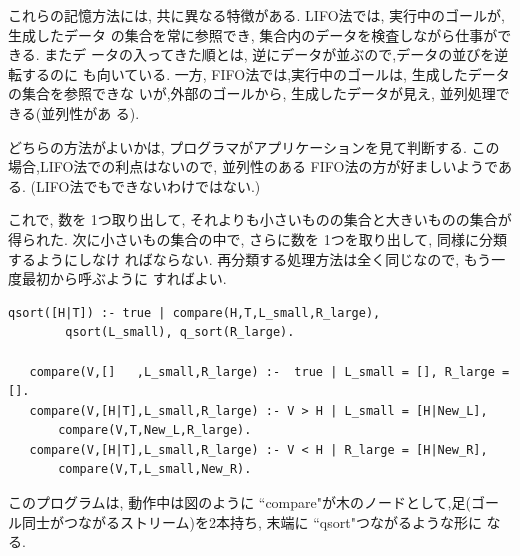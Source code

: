 \documentclass[a4,titlepage]{jsreport}
\def\_{\leavevmode \kern.06em \vbox{\hrule width.3em}\penalty\exhyphenpenalty}
\begin{document}
  これらの記憶方法には,  共に異なる特徴がある. 
LIFO法では,  実行中のゴールが,  生成したデータ
の集合を常に参照でき,  集合内のデータを検査しながら仕事ができる.  またデ
ータの入ってきた順とは,  逆にデータが並ぶので,データの並びを逆転するのに
も向いている. 
  一方,  FIFO法では,実行中のゴールは,  生成したデータの集合を参照できな
いが,外部のゴールから,  生成したデータが見え,  並列処理できる(並列性があ
る).  \par
  どちらの方法がよいかは,  プログラマがアプリケーションを見て判断する.  
  この場合,LIFO法での利点はないので,  並列性のある
  FIFO法の方が好ましいようである. (LIFO法でもできないわけではない.)

  これで, 数を 1つ取り出して,  それよりも小さいものの集合と大きいものの集合が
得られた.
次に小さいもの集合の中で,  さらに数を 1つを取り出して,  同様に分類するようにしなけ
ればならない.  再分類する処理方法は全く同じなので,  もう一度最初から呼ぶように
すればよい.  

\begin{Verbatim}[baselinestretch=0.8]
   qsort([H|T]) :- true | compare(H,T,L_small,R_large),
        qsort(L_small), q_sort(R_large).

   compare(V,[]   ,L_small,R_large) :-  true | L_small = [], R_large = [].
   compare(V,[H|T],L_small,R_large) :- V > H | L_small = [H|New_L],
       compare(V,T,New_L,R_large).
   compare(V,[H|T],L_small,R_large) :- V < H | R_large = [H|New_R],
       compare(V,T,L_small,New_R).
\end{Verbatim}

  このプログラムは,  動作中は図のように ``compare"が木のノードとして,足(ゴー
ル同士がつながるストリーム)を2本持ち,  末端に ``qsort"つながるような形に
なる.  
\end{document}
